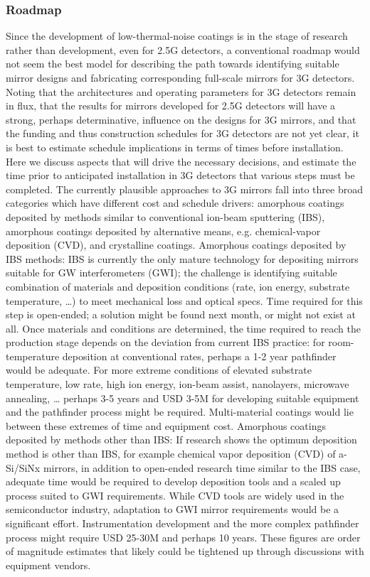 \subsubsection{Roadmap}
Since the development of low-thermal-noise coatings is in the stage of research rather than development, even for 2.5G detectors, a conventional roadmap would not seem the best model for describing the path towards identifying suitable mirror designs and fabricating corresponding full-scale mirrors for 3G detectors. Noting that the architectures and operating parameters for 3G detectors remain in flux, that the results for mirrors developed for 2.5G detectors will have a strong, perhaps determinative, influence on the designs for 3G mirrors, and that the funding and thus construction schedules for 3G detectors are not yet clear, it is best to estimate schedule implications in terms of times before installation. Here we discuss aspects that will drive the necessary decisions, and estimate the time prior to anticipated installation in 3G detectors that various steps must be completed. 
The currently plausible approaches to 3G mirrors fall into three broad categories which have different cost and schedule drivers: amorphous coatings deposited by methods similar to conventional ion-beam sputtering (IBS), amorphous coatings deposited by alternative means, e.g. chemical-vapor deposition (CVD), and crystalline coatings. 
Amorphous coatings deposited by IBS methods: IBS is currently the only mature technology for depositing mirrors suitable for GW interferometers (GWI); the challenge is identifying suitable combination of materials and deposition conditions (rate, ion energy, substrate temperature, …) to meet mechanical loss and optical specs. Time required for this step is open-ended; a solution might be found next month, or might not exist at all. Once materials and conditions are determined, the time required to reach the production stage depends on the deviation from current IBS practice: for room-temperature deposition at conventional rates, perhaps a 1-2 year pathfinder would be adequate. For more extreme conditions of elevated substrate temperature, low rate, high ion energy, ion-beam assist, nanolayers, microwave annealing, … perhaps 3-5 years and USD 3-5M for developing suitable equipment and the pathfinder process might be required. Multi-material coatings would lie between these extremes of time and equipment cost. 
Amorphous coatings deposited by methods other than IBS: If research shows the optimum  deposition method is other than IBS, for example chemical vapor deposition (CVD) of a-Si/SiNx mirrors, in addition to open-ended research time similar to the IBS case, adequate time would be required to develop deposition tools and a scaled up process suited to GWI requirements. While CVD tools are widely used in the semiconductor industry, adaptation to GWI mirror requirements would be a significant effort. Instrumentation development and the more complex pathfinder process might require  USD 25-30M and perhaps 10 years. These figures are order of magnitude estimates that likely could be tightened up through discussions with equipment vendors. 
